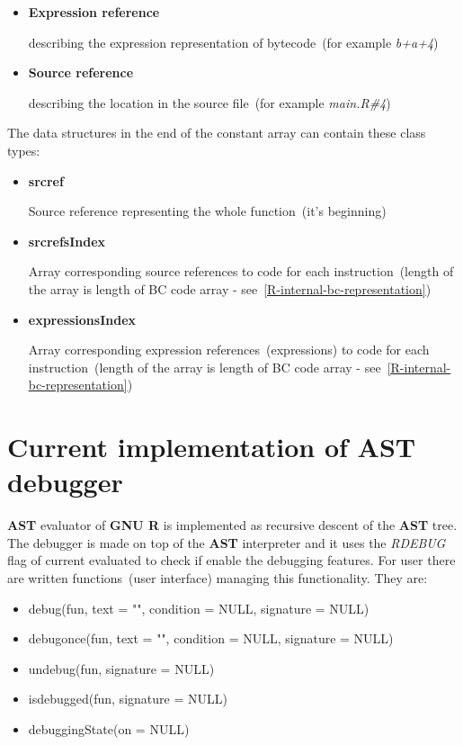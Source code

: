 \documentclass[thesis=M,english]{FITthesis}[2018/10/20]
\begin{document}
\begin{itemize}
	\item \textbf{Expression reference}

describing the expression representation of bytecode~(for example \textit{b+a+4})

	\item \textbf{Source reference}

describing the location in the source file~(for example \textit{main.R{\#}4})
\end{itemize}

The data structures in the end of the constant array can contain these class types:

\begin{itemize}
	\item \textbf{srcref}

Source reference representing the whole function~(it's beginning)

	\item \textbf{srcrefsIndex}

Array corresponding source references to code for each instruction~(length of the array is length of BC code array - see~\ref{R-internal-bc-representation})

	\item \textbf{expressionsIndex}

Array corresponding expression references~(expressions) to code for each instruction~(length of the array is length of BC code array - see~\ref{R-internal-bc-representation})

\end{itemize}

\section{Current implementation of AST debugger}\label{AST-debugger}

\textbf{AST} evaluator of \textbf{GNU R} is implemented as recursive descent of the \textbf{AST} tree.
The debugger is made on top of the \textbf{AST} interpreter and it uses the \textit{RDEBUG} flag of current evaluated to check if enable the debugging features. For user there are written functions~(user interface) managing this functionality. They are:

\begin{itemize}
	\item debug(fun, text = "", condition = NULL, signature = NULL)
	\item debugonce(fun, text = "", condition = NULL, signature = NULL)
	\item undebug(fun, signature = NULL)
	\item isdebugged(fun, signature = NULL)
	\item debuggingState(on = NULL)
\end{itemize}
\end{document}
